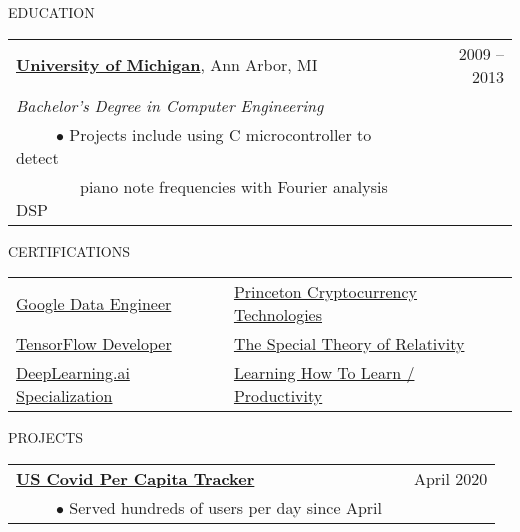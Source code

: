\documentclass[11pt]{article}
\begin{document}
\vspace{.8cm}
\newpage
{EDUCATION}
\vspace{0.4cm}

\begin{tabularx}{\linewidth}{l X r}
\textbf{\href{https://www.eecs.umich.edu/eecs/undergraduate/}{University of Michigan}}, Ann Arbor, MI & &  2009 -- 2013 \\
\emph{Bachelor's Degree in Computer Engineering} \\
~~~~~$\bullet$ Projects include using C microcontroller to detect  \\
~~~~~~~~piano note frequencies with Fourier analysis DSP\\
\end{tabularx}

\vspace {0.8cm}



{CERTIFICATIONS}
\vspace {0.4cm}

\begin{tabularx}{\linewidth}{X X X}
 \href{https://www.credential.net/672098b8-2c29-4ed8-a4fe-aec082d55316}{Google Data Engineer}&
 
 \href{https://www.dropbox.com/s/h4mbfe9f79o2x32/proof.png?raw=1}{Princeton  Cryptocurrency Technologies} \\

\href{https://coursera.org/share/1f7fbcab2199ace5323637ba261157c4}{TensorFlow Developer} &
 
 \href{https://www.coursera.org/account/accomplishments/certificate/9RBZ3CDBVBND}{The Special Theory of Relativity} \\
 
 \href{https://www.coursera.org/account/accomplishments/specialization/DYW5MPE86QH7}{DeepLearning.ai Specialization} &

\href{https://www.coursera.org/account/accomplishments/certificate/PTADANB8K8UJ}{Learning How To Learn / Productivity} \\

\end{tabularx}


\vspace {.8cm}


{PROJECTS}
\vspace {0.4cm}

\begin{tabularx}{\linewidth}{l X r}
\textbf{\href{https://us-covid19-per-capita.net}{US Covid Per Capita Tracker}} & & April 2020  \\
~~~~~$\bullet$ Served hundreds of users per day since April\\
\end{tabularx}
\end{document}

